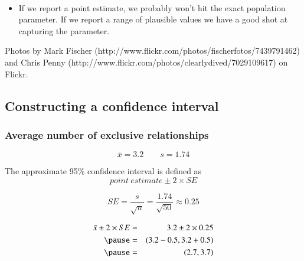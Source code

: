 \begin{frame}[shrink]
\begin{itemize}
\begin{columns}[c]
\end{columns}
$\:$ \\
\item If we report a point estimate, we probably won't hit the exact population parameter. If we report a range of plausible values we have a good shot at capturing the parameter. 

\end{itemize}

{\tiny Photos by Mark Fischer (http://www.flickr.com/photos/fischerfotos/7439791462) and Chris Penny (http://www.flickr.com/photos/clearlydived/7029109617) on Flickr.}


\end{frame}


\subsection{Constructing a confidence interval}


\begin{frame}
\frametitle{Average number of exclusive relationships}


\pause 

\vspace{-0.5cm}
\[ \bar{x} = 3.2 \qquad s = 1.74 \]

\pause

The approximate 95\% confidence interval is defined as 
\[ point~estimate \pm 2 \times SE \]

\pause

\vspace{-0.25cm}
\[ SE = \frac{s}{\sqrt{n}} = \frac{1.74}{\sqrt{50}} \approx 0.25 \]

\pause

\vspace{-0.25cm}
\begin{eqnarray*}
\bar{x} \pm 2 \times SE &=& 3.2 \pm 2 \times 0.25 \\
\pause
&=& (3.2 - 0.5, 3.2 + 0.5) \\
\pause
&=& (2.7, 3.7)
\end{eqnarray*}


\end{frame}

